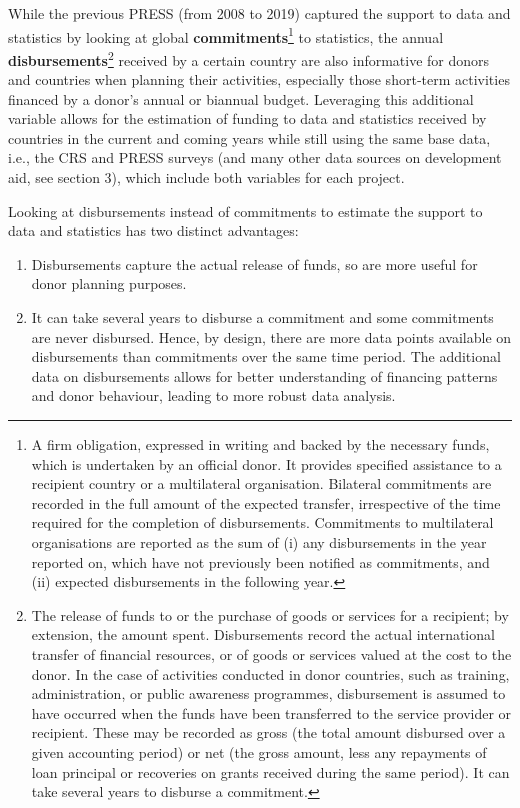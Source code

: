 \documentclass[
]{article}
\begin{document}
While the previous PRESS (from 2008 to 2019) captured the support to data and statistics by looking
at global \textbf{commitments}\footnote{A firm obligation, expressed in writing and backed by the necessary funds, which is undertaken by an official
  donor. It provides specified assistance to a recipient country or a multilateral organisation. Bilateral
  commitments are recorded in the full amount of the expected transfer, irrespective of the time required for the
  completion of disbursements. Commitments to multilateral organisations are reported as the sum of (i) any
  disbursements in the year reported on, which have not previously been notified as commitments, and (ii)
  expected disbursements in the following year.}
to statistics, the annual \textbf{disbursements}\footnote{The release of funds to or the purchase of goods or services for a recipient; by extension, the amount spent. Disbursements record the actual international transfer of financial resources, or of goods or services valued at
  the cost to the donor. In the case of activities conducted in donor countries, such as training, administration, or
  public awareness programmes, disbursement is assumed to have occurred when the funds have been
  transferred to the service provider or recipient. These may be recorded as gross (the total amount disbursed
  over a given accounting period) or net (the gross amount, less any repayments of loan principal or recoveries
  on grants received during the same period). It can take several years to disburse a commitment.}
received by a certain country are also informative for donors and countries when planning their activities, especially those short‐term
activities financed by a donor's annual or biannual budget. Leveraging this additional variable allows
for the estimation of funding to data and statistics received by countries in the current and coming
years while still using the same base data, i.e., the CRS and PRESS surveys (and many other data
sources on development aid, see section 3), which include both variables for each project.

Looking at disbursements instead of commitments to estimate the support to data and statistics has
two distinct advantages:

\begin{enumerate}
\def\labelenumi{\arabic{enumi}.}
\item
  Disbursements capture the actual release of funds, so are more useful for donor planning purposes.
\item
  It can take several years to disburse a commitment and some commitments are never
  disbursed. Hence, by design, there are more data points available on disbursements than
  commitments over the same time period. The additional data on disbursements allows for
  better understanding of financing patterns and donor behaviour, leading to more robust data analysis.
\end{enumerate}
\end{document}
